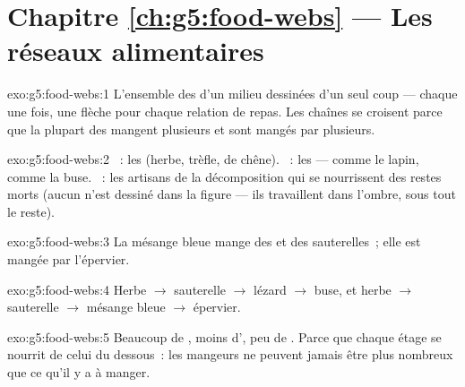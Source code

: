 \section*{Chapitre \ref{ch:g5:food-webs} --- Les réseaux alimentaires}

\begin{solution}{exo:g5:food-webs:1}
L'ensemble des  d'un milieu dessinées d'un seul
coup --- chaque  une fois, une flèche pour chaque relation de
repas. Les chaînes se croisent parce que la plupart des 
mangent plusieurs  et sont mangés par plusieurs.
\end{solution}

\begin{solution}{exo:g5:food-webs:2}
~: les  (herbe, trèfle,  de chêne).
~: les  ---  comme le lapin,
 comme la buse. ~: les artisans de la
décomposition qui se nourrissent des restes morts (aucun n'est
dessiné dans la figure --- ils travaillent dans l'ombre, sous tout
le reste).
\end{solution}

\begin{solution}{exo:g5:food-webs:3}
La mésange bleue mange des  et des sauterelles~; elle est
mangée par l'épervier.
\end{solution}

\begin{solution}{exo:g5:food-webs:4}
Herbe $\rightarrow$ sauterelle $\rightarrow$ lézard $\rightarrow$
buse, et herbe $\rightarrow$ sauterelle $\rightarrow$ mésange bleue
$\rightarrow$ épervier.
\end{solution}

\begin{solution}{exo:g5:food-webs:5}
Beaucoup de , moins d', peu de .
Parce que chaque étage se nourrit de celui du dessous~: les mangeurs
ne peuvent jamais être plus nombreux que ce qu'il y a à manger.
\end{solution}

